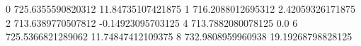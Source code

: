 0 725.6355590820312 11.84735107421875
1 716.2088012695312 2.42059326171875
2 713.6389770507812 -0.14923095703125
4 713.7882080078125 0.0
6 725.5366821289062 11.74847412109375
8 732.9808959960938 19.19268798828125
